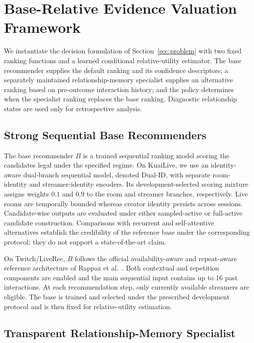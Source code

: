 \section{Base-Relative Evidence Valuation Framework}
\label{sec:framework}

We instantiate the decision formulation of Section~\ref{sec:problem} with two fixed ranking functions and a learned conditional relative-utility estimator. The base recommender supplies the default ranking and its confidence descriptors; a separately maintained relationship-memory specialist supplies an alternative ranking based on pre-outcome interaction history; and the policy determines when the specialist ranking replaces the base ranking. Diagnostic relationship states are used only for retrospective analysis.

\subsection{Strong Sequential Base Recommenders}
\label{sec:base-models}

The base recommender $B$ is a trained sequential ranking model scoring the candidates legal under the specified regime. On KuaiLive, we use an identity-aware dual-branch sequential model, denoted Dual-ID, with separate room-identity and streamer-identity encoders. Its development-selected scoring mixture assigns weights $0.1$ and $0.9$ to the room and streamer branches, respectively. Live rooms are temporally bounded whereas creator identity persists across sessions. Candidate-wise outputs are evaluated under either sampled-active or full-active candidate construction. Comparisons with recurrent and self-attentive alternatives establish the credibility of the reference base under the corresponding protocol; they do not support a state-of-the-art claim.

On Twitch/LiveRec, $B$ follows the official availability-aware and repeat-aware reference architecture of Rappaz et al.~\cite{rappaz2021liverec}. Both contextual and repetition components are enabled and the main sequential input contains up to 16 past interactions. At each recommendation step, only currently available streamers are eligible. The base is trained and selected under the prescribed development protocol and is then fixed for relative-utility estimation.

\subsection{Transparent Relationship-Memory Specialist}
\label{sec:memory-specialist}

